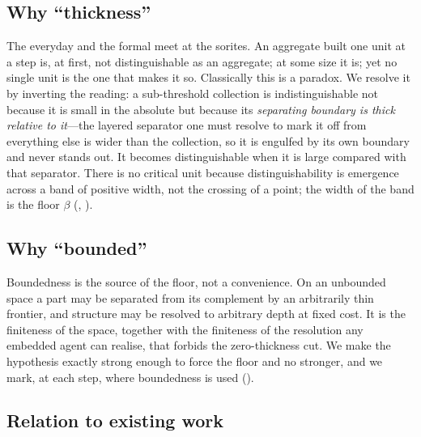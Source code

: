 \documentclass[11pt,a4paper]{article}
\theoremstyle{thmstyle}
\theoremstyle{definition}
\theoremstyle{remark}
\newcommand{\thick}{\beta}
\begin{document}
\subsection{Why ``thickness''}

The everyday and the formal meet at the sorites. An aggregate built one unit
at a step is, at first, not distinguishable as an aggregate; at some size it
is; yet no single unit is the one that makes it so. Classically this is a
paradox. We resolve it by inverting the reading: a sub-threshold collection is
indistinguishable not because it is small in the absolute but because its
\emph{separating boundary is thick relative to it}---the layered separator one
must resolve to mark it off from everything else is wider than the collection,
so it is engulfed by its own boundary and never stands out. It becomes
distinguishable when it is large compared with that separator. There is no
critical unit because distinguishability is emergence across a band of
positive width, not the crossing of a point; the width of the band is the
floor $\thick$ (, ).

\subsection{Why ``bounded''}

Boundedness is the source of the floor, not a convenience. On an unbounded
space a part may be separated from its complement by an arbitrarily thin
frontier, and structure may be resolved to arbitrary depth at fixed cost. It
is the finiteness of the space, together with the finiteness of the resolution
any embedded agent can realise, that forbids the zero-thickness cut. We make
the hypothesis exactly strong enough to force the floor and no stronger, and
we mark, at each step, where boundedness is used ().

\subsection{Relation to existing work}
\end{document}

